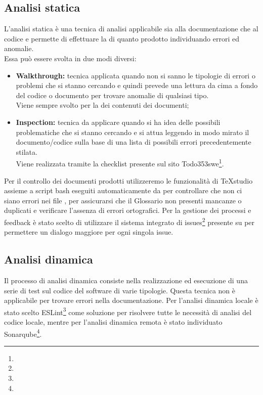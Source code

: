 \documentclass[NormeDiProgetto.tex]{subfiles}
\begin{document}
	\subsection{Analisi statica}
	L'analisi statica è una tecnica di analisi applicabile sia alla documentazione che al codice e permette di effettuare la  di quanto prodotto individuando errori ed anomalie.\\
	Essa può essere svolta in due modi diversi:
		\begin{itemize}
			\item \textbf{Walkthrough:} tecnica applicata quando non si sanno le tipologie di errori o problemi che si stanno cercando e quindi prevede una lettura da cima a fondo del codice o documento per trovare anomalie di qualsiasi tipo.\\
			Viene sempre svolto per la  dei contenuti dei documenti;
						
			\item \textbf{Inspection:} tecnica da applicare quando si ha idea delle possibili problematiche che si stanno cercando e si attua leggendo in modo mirato il documento/codice sulla base di una lista di possibili errori precedentemente stilata.\\
			Viene realizzata tramite la checklist presente sul sito Todo353swe\footnote{}.
		\end{itemize}
	
	Per il controllo dei documenti prodotti utilizzeremo le funzionalità di TeXstudio assieme a script bash eseguiti automaticamente da  per controllare che non ci siano errori nei file , per assicurarsi che il Glossario non presenti mancanze o duplicati e verificare l'assenza di errori ortografici.
	Per la gestione dei processi e feedback è stato scelto di utilizzare il sistema integrato di issues\footnote{} presente su  per permettere un dialogo maggiore per ogni singola issue. 
	
	\subsection{Analisi dinamica}
	Il processo di analisi dinamica consiste nella realizzazione ed esecuzione di una serie di test sul codice del software di varie tipologie. Questa tecnica non è applicabile per trovare errori nella documentazione.
	Per l'analisi dinamica locale è stato scelto ESLint\footnote{} come soluzione per risolvere tutte le necessità di analisi del codice locale, mentre per l'analisi dinamica remota è stato individuato Sonarqube\footnote{}.
	
\end{document}
